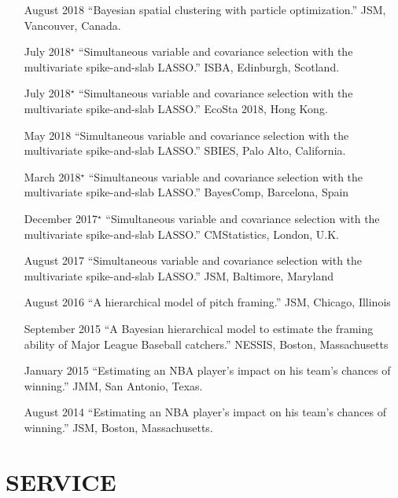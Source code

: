 \documentclass[margin]{res}
\begin{document}
\begin{resume}
{\begin{itemize}
\item[August 2018]{``Bayesian spatial clustering with particle optimization.'' JSM, Vancouver, Canada.}

\item[July 2018$^{\star}$]{``Simultaneous variable and covariance selection with the multivariate spike-and-slab LASSO.'' ISBA, Edinburgh, Scotland.}

\item[July 2018$^{\star}$]{``Simultaneous variable and covariance selection with the multivariate spike-and-slab LASSO.'' EcoSta 2018, Hong Kong.}

\item[May 2018]{``Simultaneous variable and covariance selection with the multivariate spike-and-slab LASSO.'' SBIES, Palo Alto, California.}

\item[March 2018$^{\star}$]{``Simultaneous variable and covariance selection with the multivariate spike-and-slab LASSO.'' BayesComp, Barcelona, Spain}

\item[December 2017$^{\star}$]{``Simultaneous variable and covariance selection with the multivariate spike-and-slab LASSO.'' CMStatistics, London, U.K.}

\item[August 2017]{``Simultaneous variable and covariance selection with the multivariate spike-and-slab LASSO.'' JSM, Baltimore, Maryland}

\item[August 2016]{``A hierarchical model of pitch framing.'' JSM, Chicago, Illinois}

\item[September 2015]{``A Bayesian hierarchical model to estimate the framing ability of Major League Baseball catchers.'' NESSIS, Boston, Massachusetts}

\item[January 2015]{``Estimating an NBA player's impact on his team's chances of winning.'' JMM, San Antonio, Texas.}

\item[August 2014]{``Estimating an NBA player's impact on his team's chances of winning.'' JSM, Boston, Massachusetts.}

\end{itemize}
}
\section{SERVICE}


\end{resume}
\end{document}
